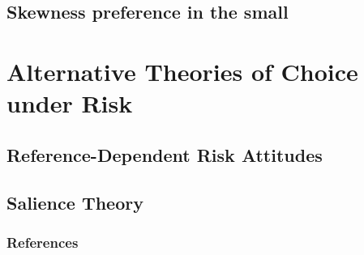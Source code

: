 \documentclass[11pt, aspectratio=169]{beamer}
\begin{document}
\subsection{Skewness preference in the small}


\section{Alternative Theories of Choice under Risk}
\subsection{Reference-Dependent Risk Attitudes}
\subsection{Salience Theory}

\begin{frame}[allowframebreaks]
    \frametitle{References}
    \renewcommand{\bibfont}{\normalfont\footnotesize}
    \printbibliography
\end{frame}
\end{document}

